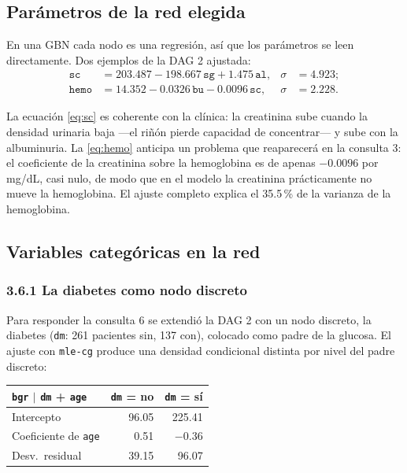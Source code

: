 \documentclass[11pt, a4paper]{article}
\begin{document}
\subsection{Parámetros de la red elegida}

En una GBN cada nodo es una regresión, así que los parámetros se leen directamente. Dos ejemplos de
la DAG 2 ajustada:
\begin{align}
    \texttt{sc} &= 203.487 - 198.667\,\texttt{sg} + 1.475\,\texttt{al}, & \sigma &= 4.923;
    \label{eq:sc}\\
    \texttt{hemo} &= 14.352 - 0.0326\,\texttt{bu} - 0.0096\,\texttt{sc}, & \sigma &= 2.228.
    \label{eq:hemo}
\end{align}

La ecuación \eqref{eq:sc} es coherente con la clínica: la creatinina sube cuando la densidad
urinaria baja —el riñón pierde capacidad de concentrar— y sube con la albuminuria. La
\eqref{eq:hemo} anticipa un problema que reaparecerá en la consulta 3: el coeficiente de la
creatinina sobre la hemoglobina es de apenas $-0.0096$ por mg/dL, casi nulo, de modo que en el
modelo la creatinina prácticamente no mueve la hemoglobina. El ajuste completo explica el 35.5\,\%
de la varianza de la hemoglobina.

\subsection{Variables categóricas en la red}
\label{sec:categoricas}

\subsubsection*{3.6.1 La diabetes como nodo discreto}

Para responder la consulta 6 se extendió la DAG 2 con un nodo discreto, la diabetes
(\texttt{dm}: 261 pacientes sin, 137 con), colocado como padre de la glucosa. El ajuste con
\texttt{mle-cg} produce una densidad condicional distinta por nivel del padre discreto:

\begin{center}\small
\begin{tabular}{l r r}
\toprule
\textbf{\texttt{bgr} $\mid$ \texttt{dm} + \texttt{age}} & \textbf{\texttt{dm} = no} & \textbf{\texttt{dm} = sí} \\
\midrule
Intercepto                 &  96.05 & 225.41 \\
Coeficiente de \texttt{age} &   0.51 &  $-0.36$ \\
Desv.\ residual            &  39.15 &  96.07 \\
\bottomrule
\end{tabular}
\end{center}
\end{document}
